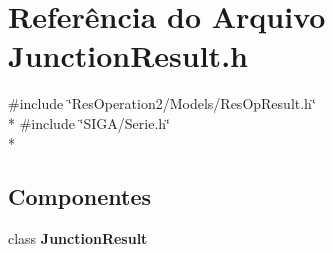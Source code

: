 \section{Referência do Arquivo Junction\+Result.\+h}
\label{_2_models_2_junction_2_junction_result_8h}
{\ttfamily \#include \char`\"{}Res\+Operation2/\+Models/\+Res\+Op\+Result.\+h\char`\"{}}\\*
{\ttfamily \#include \char`\"{}S\+I\+G\+A/\+Serie.\+h\char`\"{}}\\*
\subsection*{Componentes}
\begin{DoxyCompactItemize}
\item 
class {\bf Junction\+Result}
\end{DoxyCompactItemize}
